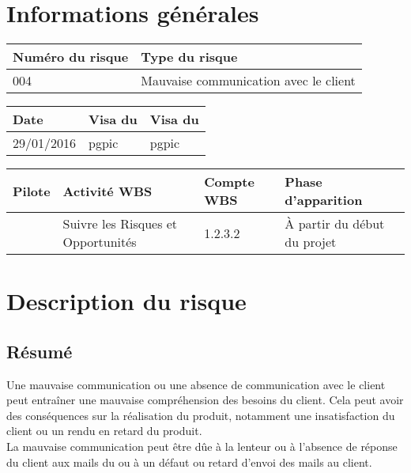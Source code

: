 
\section*{Informations générales}
 
\begin{table}[H]
\centering
	\begin{tabularx}{16.8cm}{|X|X|}
	\hline
	\rowcolor{gray!40} Numéro du risque & Type du risque \\
	\hline
	004 & Mauvaise communication avec le client \\
	\hline
	\end{tabularx}
\end{table}

\begin{table}[H]
\centering
	\begin{tabularx}{16.8cm}{|X|X|X|}
	\hline
	\rowcolor{gray!40} Date & Visa du \RQ & Visa du \CP \\
	\hline
	 29/01/2016 & pgpic & pgpic \\
	\hline
	\end{tabularx}
\end{table}

\begin{table}[H]
\centering
	\begin{tabularx}{16.8cm}{|X|X|X|X|}
	\hline
	\rowcolor{gray!40} Pilote & Activité WBS & Compte WBS & Phase d'apparition \\
	\hline
	 \Julie & Suivre les Risques et Opportunités & 1.2.3.2 & À partir du début du projet\\
	\hline
	\end{tabularx}
\end{table}

\section*{Description du risque}

\subsection*{Résumé}
	Une mauvaise communication ou une absence de communication avec le client peut entraîner une mauvaise compréhension des besoins du client. Cela peut avoir des conséquences sur la réalisation du produit, notamment une insatisfaction du client ou un rendu en retard du produit. \\
	La mauvaise communication peut être dûe à la lenteur ou à l'absence de réponse du client aux mails du \CP{} ou à un défaut ou retard d'envoi des mails au client.
